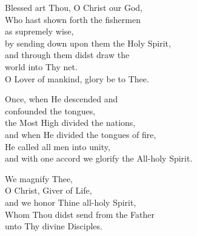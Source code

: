 \documentclass{article}
\begin{document}
%
Blessed art Thou, O Christ our God, \\
Who hast shown forth the fishermen \\
    \cont as supremely wise, \\
by sending down upon them the Holy Spirit, \\
and through them didst draw the \\
    \cont world into Thy net. \\
O Lover of mankind, glory be to Thee.

Once, when He descended and \\
   \cont confounded the tongues, \\
the Most High divided the nations, \\
and when He divided the tongues of fire, \\
He called all men into unity, \\
and with one accord we glorify the All-holy Spirit.

We magnify Thee, \\
O Christ, Giver of Life, \\
and we honor Thine all-holy Spirit, \\
Whom Thou didst send from the Father \\
unto Thy divine Disciples.

\vfill
\end{document}
